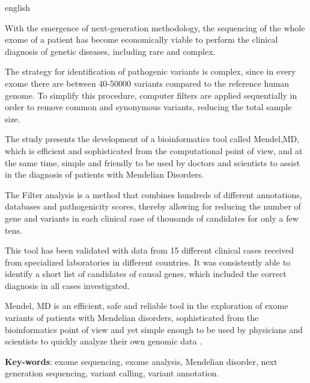 \documentclass[
	12pt,				%
	openany,			%
	oneside,			%
	a4paper,			%
	english,			%
	brazil,				%
	]{abntex2}
\begin{document}
% 

\begin{resumo}[Abstract]
 \begin{otherlanguage*}{english}

With the emergence of next-generation methodology, the sequencing of the whole exome of a patient has become economically viable to perform the clinical diagnosis of genetic diseases, including rare and complex. 

The strategy for identification of pathogenic variants is complex, since in every exome there are between 40-50000 variants compared to the reference human genome. To simplify this procedure, computer filters are applied sequentially in order to remove common and synonymous variants, reducing the total sample size.

The study presents the development of a bioinformatics tool called Mendel,MD, which is efficient and sophisticated from the computational point of view, and at the same time, simple and friendly to be used by doctors and scientists to assist in the diagnosis of patients with Mendelian Disorders. 

The Filter analysis is a method that combines hundreds of different annotations, databases and pathogenicity scores, thereby allowing for reducing the number of gene and variants in each clinical case of thousands of candidates for only a few tens. 

This tool has been validated with data from 15 different clinical cases received from specialized laboratories in different countries. It was consistently able to identify a short list of candidates of causal genes, which included the correct diagnosis in all cases investigated.

Mendel, MD is an efficient, safe and reliable tool in the exploration of exome variants of patients with Mendelian disorders, sophisticated from the bioinformatics point of view and yet simple enough to be used by physicians and scientists to quickly analyze their own genomic data .

   \vspace{\onelineskip}
 
   \noindent 
   \textbf{Key-words}: exome sequencing, exome analysis, Mendelian disorder, next generation sequencing, variant calling, variant annotation.
 \end{otherlanguage*}
\end{resumo}
\end{document}
